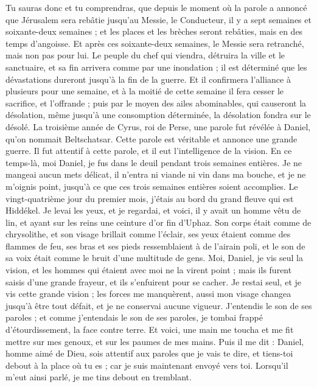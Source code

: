 \begin{multicols}{2}
Tu sauras donc et tu comprendras, que depuis le moment où la parole a annoncé que Jérusalem sera rebâtie jusqu'au Messie, le Conducteur, il y a sept semaines et soixante-deux semaines ; et les places et les brèches seront rebâties, mais en des temps d'angoisse.
Et après ces soixante-deux semaines, le Messie sera retranché, mais non pas pour lui. Le peuple du chef qui viendra, détruira la ville et le sanctuaire, et sa fin arrivera comme par une inondation ; il est déterminé que les dévastations dureront jusqu'à la fin de la guerre.
Et il confirmera l'alliance à plusieurs pour une semaine, et à la moitié de cette semaine il fera cesser le sacrifice, et l'offrande ; puis par le moyen des ailes abominables, qui causeront la désolation, même jusqu'à une consomption déterminée, la désolation fondra sur le désolé.
\VerseOne{}La troisième année de Cyrus, roi de Perse, une parole fut révélée à Daniel, qu'on nommait Beltschatsar. Cette parole est véritable et annonce une grande guerre. Il fut attentif à cette parole, et il eut l'intelligence de la vision.
En ce temps-là, moi Daniel, je fus dans le deuil pendant trois semaines entières.
Je ne mangeai aucun mets délicat, il n'entra ni viande ni vin dans ma bouche, et je ne m'oignis point, jusqu'à ce que ces trois semaines entières soient accomplies.
Le vingt-quatrième jour du premier mois, j'étais au bord du grand fleuve qui est Hiddékel.
Je levai les yeux, et je regardai, et voici, il y avait un homme vêtu de lin, et ayant sur les reins une ceinture d'or fin d'Uphaz.
Son corps était comme de chrysolithe, et son visage brillait comme l'éclair, ses yeux étaient comme des flammes de feu, ses bras et ses pieds ressemblaient à de l'airain poli, et le son de sa voix était comme le bruit d'une multitude de gens.
Moi, Daniel, je vis seul la vision, et les hommes qui étaient avec moi ne la virent point ; mais ils furent saisis d'une grande frayeur, et ils s'enfuirent pour se cacher.
Je restai seul, et je vis cette grande vision ; les forces me manquèrent, aussi mon visage changea jusqu'à être tout défait, et je ne conservai aucune vigueur.
J'entendis le son de ses paroles ; et comme j'entendais le son de ses paroles, je tombai frappé d'étourdissement, la face contre terre.
Et voici, une main me toucha et me fit mettre sur mes genoux, et sur les paumes de mes mains.
Puis il me dit : Daniel, homme aimé de Dieu, sois attentif aux paroles que je vais te dire, et tiens-toi debout à la place où tu es ; car je suis maintenant envoyé vers toi. Lorsqu'il m'eut ainsi parlé, je me tins debout en tremblant.

\end{multicols}

